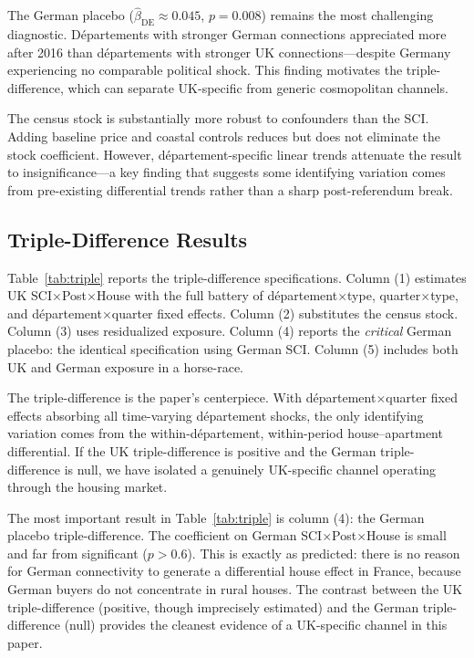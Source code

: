 \documentclass[12pt]{article}
\begin{document}
The German placebo ($\hat{\beta}_{\text{DE}} \approx 0.045$, $p = 0.008$) remains the most challenging diagnostic. D\'epartements with stronger German connections appreciated more after 2016 than d\'epartements with stronger UK connections---despite Germany experiencing no comparable political shock. This finding motivates the triple-difference, which can separate UK-specific from generic cosmopolitan channels.

The census stock is substantially more robust to confounders than the SCI. Adding baseline price and coastal controls reduces but does not eliminate the stock coefficient. However, d\'epartement-specific linear trends attenuate the result to insignificance---a key finding that suggests some identifying variation comes from pre-existing differential trends rather than a sharp post-referendum break.

\subsection{Triple-Difference Results}

Table~\ref{tab:triple} reports the triple-difference specifications. Column (1) estimates UK SCI$\times$Post$\times$House with the full battery of d\'epartement$\times$type, quarter$\times$type, and d\'epartement$\times$quarter fixed effects. Column (2) substitutes the census stock. Column (3) uses residualized exposure. Column (4) reports the \textit{critical} German placebo: the identical specification using German SCI. Column (5) includes both UK and German exposure in a horse-race.

{\footnotesize}

The triple-difference is the paper's centerpiece. With d\'epartement$\times$quarter fixed effects absorbing all time-varying d\'epartement shocks, the only identifying variation comes from the within-d\'epartement, within-period house--apartment differential. If the UK triple-difference is positive and the German triple-difference is null, we have isolated a genuinely UK-specific channel operating through the housing market.

The most important result in Table~\ref{tab:triple} is column (4): the German placebo triple-difference. The coefficient on German SCI$\times$Post$\times$House is small and far from significant ($p > 0.6$). This is exactly as predicted: there is no reason for German connectivity to generate a differential house effect in France, because German buyers do not concentrate in rural houses. The contrast between the UK triple-difference (positive, though imprecisely estimated) and the German triple-difference (null) provides the cleanest evidence of a UK-specific channel in this paper.
\end{document}

